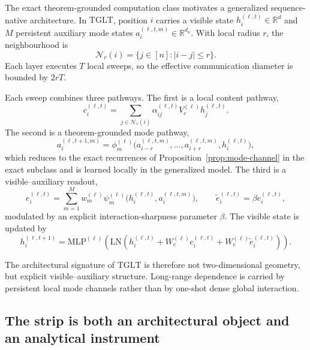 \documentclass[11pt]{article}
\theoremstyle{definition}
\newcommand{\R}{\mathbb{R}}
\newcommand{\TGLT}{\ensuremath{\mathrm{TGLT}}}
\begin{document}
The exact theorem-grounded computation class motivates a generalized sequence-native architecture. In \TGLT{}, position \(i\) carries a visible state \(h_i^{(\ell,t)}\in\R^d\) and \(M\) persistent auxiliary mode states \(a_i^{(\ell,t,m)}\in\R^{d_a}\). With local radius \(r\), the neighbourhood is
\[
\mathcal N_r(i)=\{j\in[n]: |i-j|\le r\}.
\]
Each layer executes \(T\) local sweeps, so the effective communication diameter is bounded by \(2rT\).

Each sweep combines three pathways. The first is a local content pathway,
\begin{equation}
c_i^{(\ell,t)}
=
\sum_{j\in\mathcal N_r(i)} \alpha_{ij}^{(\ell,t)} V_c^{(\ell)} h_j^{(\ell,t)}.
\label{eq:content-path}
\end{equation}
The second is a theorem-grounded mode pathway,
\begin{equation}
a_i^{(\ell,t+1,m)}
=
\phi_m^{(\ell)}\!\bigl(
a_{i-r}^{(\ell,t,m)},\dots,a_{i+r}^{(\ell,t,m)}, h_i^{(\ell,t)}
\bigr),
\label{eq:mode-update}
\end{equation}
which reduces to the exact recurrences of Proposition~\ref{prop:mode-channel} in the exact subclass and is learned locally in the generalized model. The third is a visible--auxiliary readout,
\begin{equation}
e_i^{(\ell,t)}
=
\sum_{m=1}^{M} w_m^{(\ell)} \psi_m^{(\ell)}\!\bigl(h_i^{(\ell,t)}, a_i^{(\ell,t,m)}\bigr),
\qquad
\widetilde e_i^{(\ell,t)}=\beta e_i^{(\ell,t)},
\label{eq:mode-readout}
\end{equation}
modulated by an explicit interaction-sharpness parameter \(\beta\). The visible state is updated by
\begin{equation}
h_i^{(\ell,t+1)}
=
\mathrm{MLP}^{(\ell)}
\!\left(
\mathrm{LN}\!\left(
h_i^{(\ell,t)}
+
W_c^{(\ell)} c_i^{(\ell,t)}
+
W_e^{(\ell)} \widetilde e_i^{(\ell,t)}
\right)
\right).
\label{eq:visible-update}
\end{equation}

The architectural signature of \TGLT{} is therefore not two-dimensional geometry, but explicit visible--auxiliary structure. Long-range dependence is carried by persistent local mode channels rather than by one-shot dense global interaction.

\subsection*{The strip is both an architectural object and an analytical instrument}
\end{document}
